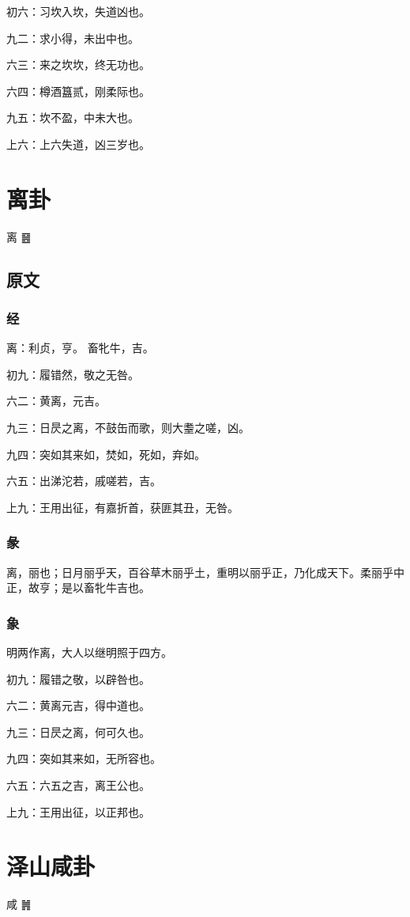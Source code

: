 \documentclass[12pt,oneside]{book}
\begin{document}
初六：习坎入坎，失道凶也。

九二：求小得，未出中也。

六三：来之坎坎，终无功也。

六四：樽酒簋贰，刚柔际也。

九五：坎不盈，中未大也。

上六：上六失道，凶三岁也。


\chapter{离卦}
离 {\Large ䷝}

\section{原文}


\subsection{经}
离：利贞，亨。 畜牝牛，吉。

初九：履错然，敬之无咎。

六二：黄离，元吉。

九三：日昃之离，不鼓缶而歌，则大耋之嗟，凶。

九四：突如其来如，焚如，死如，弃如。

六五：出涕沱若，戚嗟若，吉。

上九：王用出征，有嘉折首，获匪其丑，无咎。

\subsection{彖}
离，丽也；日月丽乎天，百谷草木丽乎土，重明以丽乎正，乃化成天下。柔丽乎中正，故亨；是以畜牝牛吉也。

\subsection{象}
明两作离，大人以继明照于四方。

初九：履错之敬，以辟咎也。

六二：黄离元吉，得中道也。

九三：日昃之离，何可久也。

九四：突如其来如，无所容也。

六五：六五之吉，离王公也。

上九：王用出征，以正邦也。


\chapter{泽山咸卦}
咸 {\Large ䷞}
\end{document}
